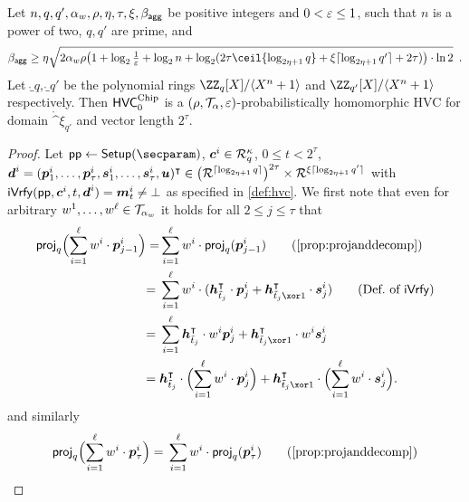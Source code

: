 \begin{lemma}\label{lem:hvcprobhom}
  Let $n,q,q',\alpha_w,\rho,\eta,\tau,\xi,\beta_{\mathsf{agg}}$ be positive integers and $0 < \varepsilon \leq 1$, such that $n$ is a power of two, $q,q'$ are prime,
and
  \[
  \bagg \geq \eta\sqrt{2\alpha_w\rho\bigl(1+ \log_2\tfrac{1}{\errorbound} +  \log_2 n + \log_2(2\tau \ceil{\log_{2\eta+1}q} + \xi\lceil\log_{2\eta+1}q'\rceil + 2\tau)\bigr)\cdot\ln2}\enspace.
  \]
  Let $\ring_q,\ring_{q'}$ be the polynomial rings $\defringq$ and $\defringqq$ respectively.
  Then $\mathsf{HVC}^{\textup{Chip}}_{0}$ is a $(\rho,\mathcal{T}_\alpha,\varepsilon)$-probabilistically homomorphic HVC for domain $\ring^\xi_{q'}$ and vector length $2^\tau$.
\end{lemma}
\begin{proof}
Let $\params \gets \setup(\secparam)$, $\boldsymbol{c}^i \in \mathcal{R}_q^\kappa$, $0 \leq t < 2^\tau$,
$\boldsymbol{d}^i = (\boldsymbol{p}^i_1,\dots,\boldsymbol{p}^i_{\tau},\boldsymbol{s}^i_1, \dots, \boldsymbol{s}^i_{\tau},\boldsymbol{u})^\intercal \in \bigl(\mathcal{R}^{\lceil\log_{2\eta+1} q\rceil}\bigr)^{2\tau} \times \mathcal{R}^{\xi\lceil\log_{2\eta+1} q'\rceil}$
with $\mathsf{iVrfy}(\mathsf{pp},\boldsymbol{c}^i,t,\boldsymbol{d}^i) = \boldsymbol{m}_t^i \neq \bot$
as specified in \autoref{def:hvc}.
%
We first note that even for arbitrary $w^1,\dots,w^{\ell}\in\mathcal{T}_{\alpha_w}$ it holds for all $2\leq j\leq \tau$ that
\begin{align*}
  \projmod{q}\Bigl(\sum_{i=1}^{\ell}w^i\cdot\vec{p}_{j-1}^i\Bigr) = &\sum_{i=1}^{\ell}w^i\cdot\projmod{q}(\vec{p}_{j-1}^i)\tag{\autoref{prop:projanddecomp}}\\
  ={}&\sum_{i=1}^{\ell}w^i\cdot(\vec{h}_{\tilde t_j}^\transpose\cdot \vec{p}^i_{j} + \vec{h}_{\tilde t_j\xor 1}^\transpose \cdot \vec{s}^i_{j})\tag{Def.\ of $\iverify$}\\
  ={}&\sum_{i=1}^{\ell}\vec{h}_{\tilde t_j}^\transpose\cdot w^i \vec{p}^i_{j} + \vec{h}_{\tilde t_j\xor 1}^\transpose\cdot w^i  \vec{s}^i_{j}\\  
  ={}& \vec{h}_{\tilde t_j}^\transpose\cdot \Bigl(\sum_{i=1}^{\ell}w^i\cdot\vec{p}^i_{j}\Bigr) + \vec{h}_{\tilde t_j \xor 1}^\transpose \cdot \Bigl(\sum_{i=1}^{\ell}w^i\cdot\vec{s}^i_{j}\Bigr).
\end{align*}
and similarly
\begin{align*}
  \projmod{q}\Bigl(\sum_{i=1}^{\ell}w^i\cdot\vec{p}_{\tau}^i\Bigr) ={}&\sum_{i=1}^{\ell}w^i\cdot\projmod{q}(\vec{p}_{\tau}^i)\tag{\autoref{prop:projanddecomp}}\\

\end{align*}
\end{proof}
